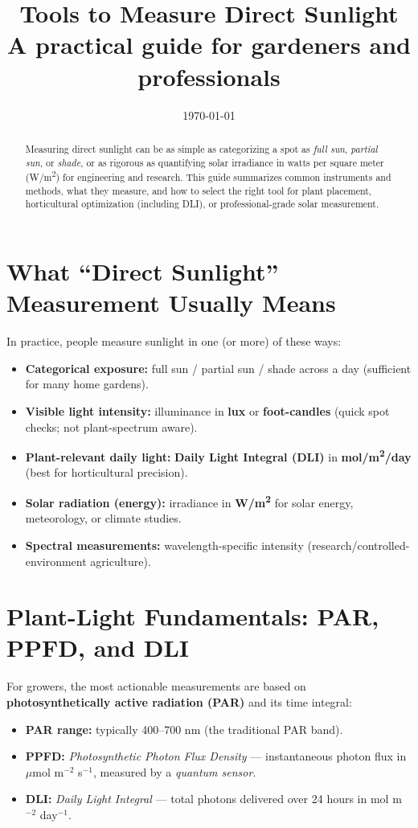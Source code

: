 \documentclass[11pt]{article}
\title{\textbf{Tools to Measure Direct Sunlight}\\
\large A practical guide for gardeners and professionals}
\author{%
}
\date{\today}
\begin{document}
\maketitle

\begin{abstract}
Measuring direct sunlight can be as simple as categorizing a spot as \emph{full sun}, \emph{partial sun}, or \emph{shade}, or as rigorous as quantifying solar irradiance in watts per square meter (W/m\textsuperscript{2}) for engineering and research. This guide summarizes common instruments and methods, what they measure, and how to select the right tool for plant placement, horticultural optimization (including DLI), or professional-grade solar measurement.
\end{abstract}

\section{What ``Direct Sunlight'' Measurement Usually Means}
In practice, people measure sunlight in one (or more) of these ways:
\begin{itemize}
  \item \textbf{Categorical exposure:} full sun / partial sun / shade across a day (sufficient for many home gardens).
  \item \textbf{Visible light intensity:} illuminance in \textbf{lux} or \textbf{foot-candles} (quick spot checks; not plant-spectrum aware).
  \item \textbf{Plant-relevant daily light:} \textbf{Daily Light Integral (DLI)} in \textbf{mol/m\textsuperscript{2}/day} (best for horticultural precision).
  \item \textbf{Solar radiation (energy):} irradiance in \textbf{W/m\textsuperscript{2}} for solar energy, meteorology, or climate studies.
  \item \textbf{Spectral measurements:} wavelength-specific intensity (research/controlled-environment agriculture).
\end{itemize}

\section{Plant-Light Fundamentals: PAR, PPFD, and DLI}
For growers, the most actionable measurements are based on \textbf{photosynthetically active radiation (PAR)} and its time integral:
\begin{itemize}
  \item \textbf{PAR range:} typically 400--700 nm (the traditional PAR band).
  \item \textbf{PPFD:} \emph{Photosynthetic Photon Flux Density} --- instantaneous photon flux in \(\mu\)mol m\(^{-2}\) s\(^{-1}\), measured by a \emph{quantum sensor}.
  \item \textbf{DLI:} \emph{Daily Light Integral} --- total photons delivered over 24 hours in mol m\(^{-2}\) day\(^{-1}\).
\end{itemize}
\end{document}
